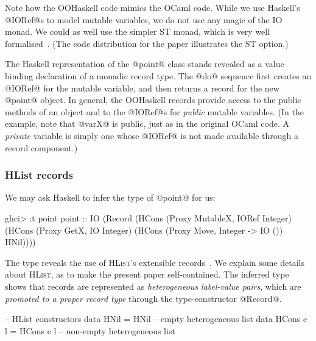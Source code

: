 \documentclass{jfp}
\newcommand{\HList}{\textsc{HList}}
\begin{document}
Note how the OOHaskell code mimics the OCaml code. While we use
Haskell's @IORef@s to model mutable variables, we do not use any magic
of the IO monad. We could as well use the simpler ST monad, which is
very well formalised~\cite{LPJ95}. (The code distribution for the
paper illustrates the ST option.)

The Haskell representation of the @point@ class stands revealed as a
value binding declaration of a monadic record type. The @do@ sequence
first creates an @IORef@ for the mutable variable, and then returns a
record for the new @point@ object. In general, the OOHaskell records
provide access to the public methods of an object and to the @IORef@s
for \emph{public} mutable variables. (In the example, note that @varX@
is public, just as in the original OCaml code. A \emph{private}
variable is simply one whose @IORef@ is not made available through a
record component.)






\subsubsection{HList records}

We may ask Haskell to infer the type of @point@ for us:

\begin{code}
 ghci> :t point
 point :: IO (Record (HCons (Proxy MutableX, IORef Integer)
                     (HCons (Proxy GetX, IO Integer)
                     (HCons (Proxy Move, Integer -> IO ())
                      HNil))))
\end{code}

The type reveals the use of \HList's extensible
records~\cite{HLIST-HW04}. We explain some details about
\HList, as to make the present paper self-contained. The inferred
type shows that records are represented as \emph{heterogeneous
label-value pairs}, which are \emph{promoted to a proper record type}
through the type-constructor @Record@.

\begin{code}
 -- HList constructors
 data HNil      = HNil      -- empty heterogeneous list
 data HCons e l = HCons e l -- non-empty heterogeneous list
\end{code}
\end{document}
